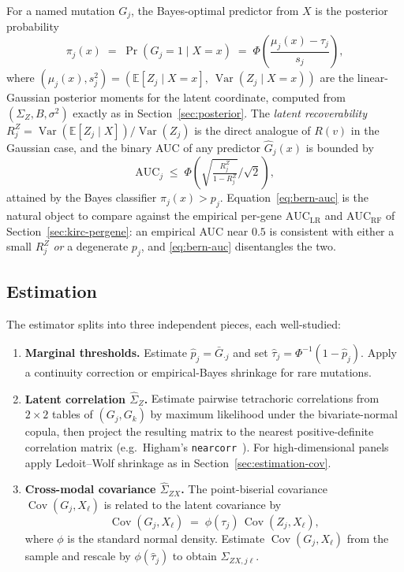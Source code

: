 \documentclass{article}
\newcommand{\E}{\mathbb{E}}
\newcommand{\Cov}{\operatorname{Cov}}
\newcommand{\Var}{\operatorname{Var}}
\begin{document}
For a named mutation $G_j$, the Bayes-optimal predictor from $X$ is the
posterior probability
\[
  \pi_j(x) \;=\; \Pr(G_j = 1 \mid X = x) \;=\; \Phi\!\left(\frac{\mu_j(x) - \tau_j}{s_j}\right),
\]
where $(\mu_j(x), s_j^2) = (\E[Z_j \mid X=x],\ \Var(Z_j \mid X=x))$ are the
linear-Gaussian posterior moments for the latent coordinate, computed from
$(\Sigma_Z, B, \sigma^2)$ exactly as in Section~\ref{sec:posterior}. The
\emph{latent recoverability} $R_j^Z = \Var(\E[Z_j\mid X]) / \Var(Z_j)$ is the
direct analogue of $R(v)$ in the Gaussian case, and the binary AUC of any
predictor $\hat G_j(x)$ is bounded by
\begin{equation}
  \mathrm{AUC}_j \;\le\; \Phi\!\left(\sqrt{\tfrac{R_j^Z}{1-R_j^Z}}\Big/\sqrt{2}\right),
  \label{eq:bern-auc}
\end{equation}
attained by the Bayes classifier $\pi_j(x) > p_j$. Equation~\eqref{eq:bern-auc}
is the natural object to compare against the empirical per-gene
$\mathrm{AUC}_{\mathrm{LR}}$ and $\mathrm{AUC}_{\mathrm{RF}}$ of
Section~\ref{sec:kirc-pergene}: an empirical AUC near $0.5$ is consistent with
either a small $R_j^Z$ \emph{or} a degenerate $p_j$, and \eqref{eq:bern-auc}
disentangles the two.

\subsection{Estimation}
\label{sec:bern-estimation}

The estimator splits into three independent pieces, each well-studied:

\begin{enumerate}
\item[(i)] \textbf{Marginal thresholds.} Estimate $\hat p_j = \bar G_{\cdot j}$
and set $\hat\tau_j = \Phi^{-1}(1-\hat p_j)$. Apply a continuity correction or
empirical-Bayes shrinkage for rare mutations.
\item[(ii)] \textbf{Latent correlation $\hat\Sigma_Z$.} Estimate pairwise
tetrachoric correlations from $2{\times}2$ tables of $(G_j, G_k)$ by maximum
likelihood under the bivariate-normal copula, then project the resulting matrix
to the nearest positive-definite correlation matrix (e.g.\ Higham's
\texttt{nearcorr}~\citep{higham2002nearcorr}). For high-dimensional panels apply Ledoit--Wolf shrinkage as
in Section~\ref{sec:estimation-cov}.
\item[(iii)] \textbf{Cross-modal covariance $\hat\Sigma_{ZX}$.} The
point-biserial covariance $\Cov(G_j, X_\ell)$ is related to the latent
covariance by
\[
  \Cov(G_j, X_\ell) \;=\; \phi(\tau_j)\,\Cov(Z_j, X_\ell),
\]
where $\phi$ is the standard normal density. Estimate $\Cov(G_j,X_\ell)$ from
the sample and rescale by $\phi(\hat\tau_j)$ to obtain $\hat\Sigma_{ZX, j\ell}$.
\end{enumerate}
\end{document}
